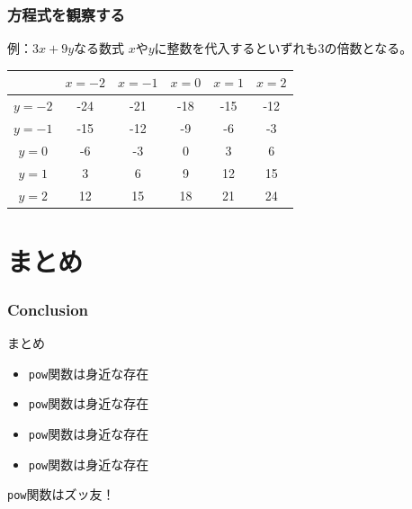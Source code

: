 \documentclass[aspectratio=169,dvipdfmx,14pt,notheorems]{beamer}
\theoremstyle{definition}
\begin{document}
\begin{frame}[fragile]\frametitle{方程式を観察する}

\begin{exampleblock}{例：$3x + 9y$なる数式}
$x$や$y$に整数を代入するといずれも3の倍数となる。
\begin{table}[]
\begin{tabular}{|c|c|c|c|c|c|}
\hline
       & $x=-2$ & $x=-1$ & $x=0$ & $x=1$ & $x=2$ \\ \hline
$y=-2$ & -24    & -21    & -18   & -15   & -12   \\ \hline
$y=-1$ & -15    & -12    & -9    & -6    & -3    \\ \hline
$y=0$  & -6     & -3     & 0     & 3     & 6     \\ \hline
$y=1$  & 3      & 6      & 9     & 12    & 15    \\ \hline
$y=2$  & 12     & 15     & 18    & 21    & 24    \\ \hline
\end{tabular}
\end{table}

\end{exampleblock}

\end{frame}

\section{まとめ}

\begin{frame}[fragile]\frametitle{Conclusion}
\begin{block}{まとめ}
\begin{itemize}
\item \texttt{pow}関数は身近な存在
\item \texttt{pow}関数は身近な存在
\item \texttt{pow}関数は身近な存在
\item \texttt{pow}関数は身近な存在
\end{itemize}
\end{block}
\texttt{pow}関数はズッ友！
\end{frame}
\end{document}
